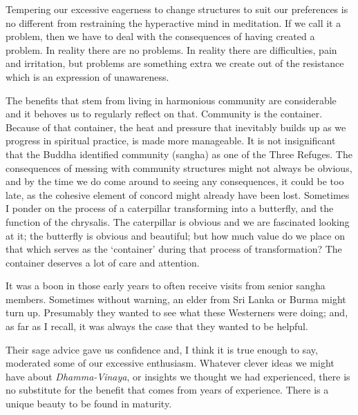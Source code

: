 Tempering our excessive eagerness to change structures to suit our
preferences is no different from restraining the hyperactive mind in
meditation. If we call it a problem, then we have to deal with the
consequences of having created a problem. In reality there are no
problems. In reality there are difficulties, pain and irritation, but
problems are something extra we create out of the resistance which is an
expression of unawareness.

The benefits that stem from living in harmonious community are
considerable and it behoves us to regularly reflect on that. Community
is the container. Because of that container, the heat and pressure that
inevitably builds up as we progress in spiritual practice, is made more
manageable. It is not insignificant that the Buddha identified community
(sangha) as one of the Three Refuges. The consequences of messing with
community structures might not always be obvious, and by the time we do
come around to seeing any consequences, it could be too late, as the
cohesive element of concord might already have been lost. Sometimes I
ponder on the process of a caterpillar transforming into a butterfly,
and the function of the chrysalis. The caterpillar is obvious and we are
fascinated looking at it; the butterfly is obvious and beautiful; but
how much value do we place on that which serves as the `container'
during that process of transformation? The container deserves a lot of
care and attention.

It was a boon in those early years to often receive visits from senior
sangha members. Sometimes without warning, an elder from Sri Lanka or
Burma might turn up. Presumably they wanted to see what these Westerners
were doing; and, as far as I recall, it was always the case that they
wanted to be helpful.

Their sage advice gave us confidence and, I think it is true enough to
say, moderated some of our excessive enthusiasm. Whatever clever ideas
we might have about \emph{Dhamma-Vinaya}, or insights we thought we had
experienced, there is no substitute for the benefit that comes from
years of experience. There is a unique beauty to be found in maturity.

\enlargethispage{\baselineskip}

